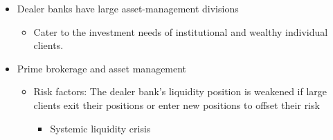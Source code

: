 \begin{itemize}
\item Dealer banks have large asset-management divisions
    \begin{itemize}
    \item Cater to the investment needs of institutional and wealthy individual clients.
    \end{itemize}
    
\item Prime brokerage and asset management
    \begin{itemize}
    \item Risk factors: The dealer bank's liquidity position is weakened if large clients exit their positions or enter new positions to offset their risk
        \begin{itemize}
        \item Systemic liquidity crisis
        \end{itemize}
        
    \end{itemize}
    
\end{itemize}



